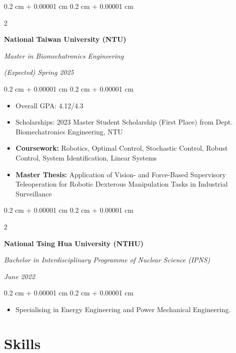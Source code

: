 \documentclass[10pt, letterpaper]{article}
\newenvironment{highlights}{
    \begin{itemize}[
        topsep=0.10 cm,
        parsep=0.10 cm,
        partopsep=0pt,
        itemsep=0pt,
        leftmargin=0.4 cm + 10pt
    ]
}{
    \end{itemize}
} %
\newenvironment{onecolentry}{
    \begin{adjustwidth}{
        0.2 cm + 0.00001 cm
    }{
        0.2 cm + 0.00001 cm
    }
}{
    \end{adjustwidth}
} %
\newenvironment{twocolentry}[2][]{
    \onecolentry
    \def\secondColumn{#2}
    \setcolumnwidth{\fill, 4.5 cm}
    \begin{paracol}{2}
}{
    \switchcolumn \raggedleft \secondColumn
    \end{paracol}
    \endonecolentry
} %
\begin{document}
        \begin{twocolentry}{
            
            
        \textit{(Expected) Spring 2025}}
            \textbf{National Taiwan University (NTU)}

            \textit{Master in Biomechatronics Engineering}
        \end{twocolentry}

        \vspace{0.10 cm}
        \begin{onecolentry}
            \begin{highlights}
                \item Overall GPA: 4.12/4.3
                \item Scholarships: 2023 Master Student Scholarship (First Place) from Dept. Biomechatronics Engineering, NTU
                \item \textbf{Coursework:} Robotics, Optimal Control, Stochastic Control, Robust Control, System Identification, Linear Systems
                \item \textbf{Master Thesis:} Application of Vision- and Force-Based Supervisory Teleoperation for Robotic Dexterous Manipulation Tasks in Industrial Surveillance
            \end{highlights}
        \end{onecolentry}

        \vspace{0.2 cm}

        \begin{twocolentry}{
            
        \textit{June 2022}}
            \textbf{National Tsing Hua University (NTHU)}
            
            \textit{Bachelor in Interdisciplinary Programme of Nuclear Science (IPNS)}
        \end{twocolentry}
        \vspace{0.10 cm}
        \begin{onecolentry}
            \begin{highlights}
                \item Specialising in Energy Engineering and Power Mechanical Engineering.
            \end{highlights}
        \end{onecolentry}


    \section{Skills}
\end{document}
